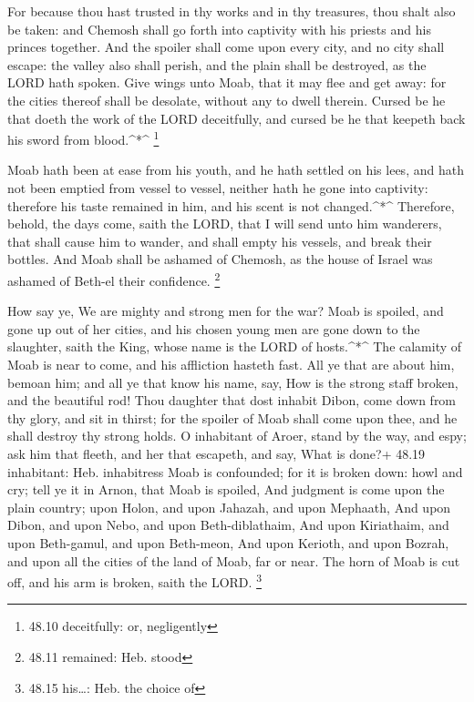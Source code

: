  For because thou hast trusted in thy works and in thy
treasures, thou shalt also be taken: and Chemosh shall go forth into
captivity with his priests and his princes together.  And
the spoiler shall come upon every city, and no city shall escape: the
valley also shall perish, and the plain shall be destroyed, as the LORD
hath spoken.  Give wings unto Moab, that it may flee and get
away: for the cities thereof shall be desolate, without any to dwell
therein.  Cursed be he that doeth the work of the LORD
deceitfully, and cursed be he that keepeth back his sword from
blood.\^{}*\^{} \footnote{48.10 deceitfully: or, negligently}

 Moab hath been at ease from his youth, and he hath settled
on his lees, and hath not been emptied from vessel to vessel, neither
hath he gone into captivity: therefore his taste remained in him, and
his scent is not changed.\^{}*\^{}  Therefore, behold, the
days come, saith the LORD, that I will send unto him wanderers, that
shall cause him to wander, and shall empty his vessels, and break their
bottles.  And Moab shall be ashamed of Chemosh, as the
house of Israel was ashamed of Beth-el their confidence. \footnote{48.11
  remained: Heb. stood}

 How say ye, We are mighty and strong men for the war?
 Moab is spoiled, and gone up out of her cities, and his
chosen young men are gone down to the slaughter, saith the King, whose
name is the LORD of hosts.\^{}*\^{}  The calamity of Moab
is near to come, and his affliction hasteth fast.  All ye
that are about him, bemoan him; and all ye that know his name, say, How
is the strong staff broken, and the beautiful rod!  Thou
daughter that dost inhabit Dibon, come down from thy glory, and sit in
thirst; for the spoiler of Moab shall come upon thee, and he shall
destroy thy strong holds.  O inhabitant of Aroer, stand by
the way, and espy; ask him that fleeth, and her that escapeth, and say,
What is done?+ 48.19 inhabitant: Heb. inhabitress  Moab is
confounded; for it is broken down: howl and cry; tell ye it in Arnon,
that Moab is spoiled,  And judgment is come upon the plain
country; upon Holon, and upon Jahazah, and upon Mephaath, 
And upon Dibon, and upon Nebo, and upon Beth-diblathaim, 
And upon Kiriathaim, and upon Beth-gamul, and upon Beth-meon,
 And upon Kerioth, and upon Bozrah, and upon all the cities
of the land of Moab, far or near.  The horn of Moab is cut
off, and his arm is broken, saith the LORD. \footnote{48.15 his\ldots:
  Heb. the choice of}

